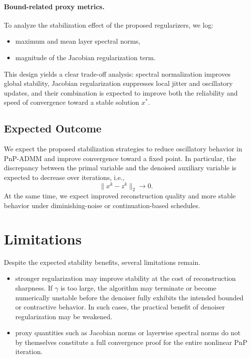 \documentclass{article}
\begin{document}
\paragraph{Bound-related proxy metrics.}
To analyze the stabilization effect of the proposed regularizers, we log:
\begin{itemize}
    \item maximum and mean layer spectral norms,
    \item magnitude of the Jacobian regularization term.
\end{itemize}

This design yields a clear trade-off analysis:
spectral normalization improves global stability, Jacobian regularization suppresses local jitter and oscillatory updates, and their combination is expected to improve both the reliability and speed of convergence toward a stable solution $x^\ast$.

\subsection{Expected Outcome}
We expect the proposed stabilization strategies to reduce oscillatory behavior in PnP-ADMM and improve convergence toward a fixed point.
In particular, the discrepancy between the primal variable and the denoised auxiliary variable is expected to decrease over iterations, i.e.,
\begin{equation}
    \|x^k - z^k\|_2 \rightarrow 0.
\end{equation}
At the same time, we expect improved reconstruction quality and more stable behavior under diminishing-noise or continuation-based schedules.

\section{Limitations}
Despite the expected stability benefits, several limitations remain.

\begin{itemize}
    \item stronger regularization may improve stability at the cost of reconstruction sharpness.
    If $\gamma$ is too large, the algorithm may terminate or become numerically unstable before the denoiser fully exhibits the intended bounded or contractive behavior.
    In such cases, the practical benefit of denoiser regularization may be weakened.
    \item proxy quantities such as Jacobian norms or layerwise spectral norms do not by themselves constitute a full convergence proof for the entire nonlinear PnP iteration.
\end{itemize}
\end{document}
